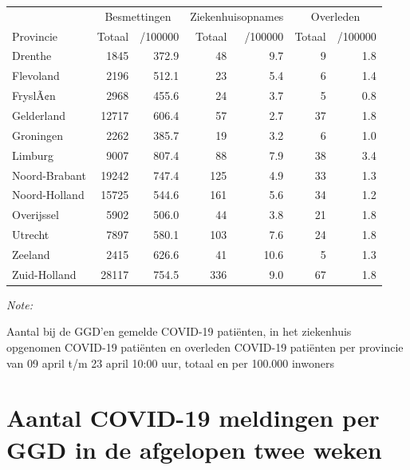 \documentclass[
  english,
  man,floatsintext]{apa6}
\begin{document}
\begin{table}
\centering
\begin{threeparttable}
\begin{tabular}{lrrrrrr}
\toprule
\multicolumn{1}{c}{ } & \multicolumn{2}{c}{Besmettingen} & \multicolumn{2}{c}{Ziekenhuisopnames} & \multicolumn{2}{c}{Overleden} \\
\cmidrule(l{3pt}r{3pt}){2-3} \cmidrule(l{3pt}r{3pt}){4-5} \cmidrule(l{3pt}r{3pt}){6-7}
Provincie & Totaal & /100000 & Totaal & /100000 & Totaal & /100000\\
\midrule
Drenthe & 1845 & 372.9 & 48 & 9.7 & 9 & 1.8\\
Flevoland & 2196 & 512.1 & 23 & 5.4 & 6 & 1.4\\
FryslÃ¢n & 2968 & 455.6 & 24 & 3.7 & 5 & 0.8\\
Gelderland & 12717 & 606.4 & 57 & 2.7 & 37 & 1.8\\
Groningen & 2262 & 385.7 & 19 & 3.2 & 6 & 1.0\\
Limburg & 9007 & 807.4 & 88 & 7.9 & 38 & 3.4\\
Noord-Brabant & 19242 & 747.4 & 125 & 4.9 & 33 & 1.3\\
Noord-Holland & 15725 & 544.6 & 161 & 5.6 & 34 & 1.2\\
Overijssel & 5902 & 506.0 & 44 & 3.8 & 21 & 1.8\\
Utrecht & 7897 & 580.1 & 103 & 7.6 & 24 & 1.8\\
Zeeland & 2415 & 626.6 & 41 & 10.6 & 5 & 1.3\\
Zuid-Holland & 28117 & 754.5 & 336 & 9.0 & 67 & 1.8\\
\bottomrule
\end{tabular}
\begin{tablenotes}
\item \textit{Note: } 
\item Aantal bij de GGD’en gemelde COVID-19 patiënten, in het ziekenhuis opgenomen COVID-19 patiënten en overleden COVID-19 patiënten per provincie van 09 april t/m 23 april 10:00 uur, totaal en per 100.000 inwoners
\end{tablenotes}
\end{threeparttable}
\end{table}

\newpage

\hypertarget{aantal-covid-19-meldingen-per-ggd-in-de-afgelopen-twee-weken}{%
\section{Aantal COVID-19 meldingen per GGD in de afgelopen twee weken}\label{aantal-covid-19-meldingen-per-ggd-in-de-afgelopen-twee-weken}}
\end{document}
